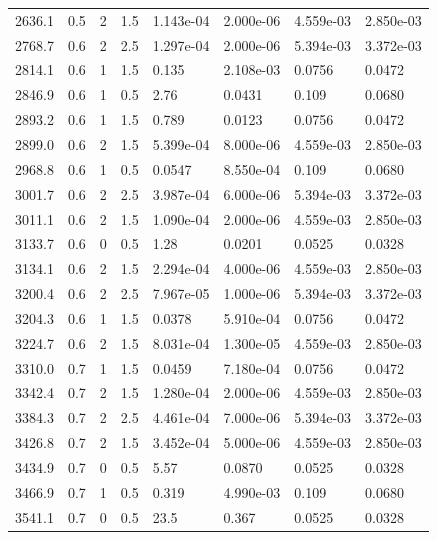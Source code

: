 \documentclass[preview]{standalone}
\begin{document}
{{{\begin{tabular}{L{1.2cm}C{1.2cm} C{0.3cm}C{0.5cm} C{1.4cm}C{1.4cm} C{1.4cm}C{1.4cm}}
  2636.1  &   0.5  & 2     & 1.5 &  1.143e-04  & 2.000e-06  & 4.559e-03 &  2.850e-03   \\ 
  2768.7  &   0.6  & 2     & 2.5 &  1.297e-04  & 2.000e-06  & 5.394e-03 &  3.372e-03   \\ 
  2814.1  &   0.6  & 1     & 1.5 &  0.135  & 2.108e-03  & 0.0756 &  0.0472   \\ 
  2846.9  &   0.6  & 1     & 0.5 &  2.76  & 0.0431  & 0.109 &  0.0680   \\ 
  2893.2  &   0.6  & 1     & 1.5 &  0.789  & 0.0123  & 0.0756 &  0.0472   \\ 
  2899.0  &   0.6  & 2     & 1.5 &  5.399e-04  & 8.000e-06  & 4.559e-03 &  2.850e-03   \\ 
  2968.8  &   0.6  & 1     & 0.5 &  0.0547  & 8.550e-04  & 0.109 &  0.0680   \\ 
  3001.7  &   0.6  & 2     & 2.5 &  3.987e-04  & 6.000e-06  & 5.394e-03 &  3.372e-03   \\ 
  3011.1  &   0.6  & 2     & 1.5 &  1.090e-04  & 2.000e-06  & 4.559e-03 &  2.850e-03   \\ 
  3133.7  &   0.6  & 0     & 0.5 &  1.28  & 0.0201  & 0.0525 &  0.0328   \\ 
  3134.1  &   0.6  & 2     & 1.5 &  2.294e-04  & 4.000e-06  & 4.559e-03 &  2.850e-03   \\ 
  3200.4  &   0.6  & 2     & 2.5 &  7.967e-05  & 1.000e-06  & 5.394e-03 &  3.372e-03   \\ 
  3204.3  &   0.6  & 1     & 1.5 &  0.0378  & 5.910e-04  & 0.0756 &  0.0472   \\ 
  3224.7  &   0.6  & 2     & 1.5 &  8.031e-04  & 1.300e-05  & 4.559e-03 &  2.850e-03   \\ 
  3310.0  &   0.7  & 1     & 1.5 &  0.0459  & 7.180e-04  & 0.0756 &  0.0472   \\ 
  3342.4  &   0.7  & 2     & 1.5 &  1.280e-04  & 2.000e-06  & 4.559e-03 &  2.850e-03   \\ 
  3384.3  &   0.7  & 2     & 2.5 &  4.461e-04  & 7.000e-06  & 5.394e-03 &  3.372e-03   \\ 
  3426.8  &   0.7  & 2     & 1.5 &  3.452e-04  & 5.000e-06  & 4.559e-03 &  2.850e-03   \\ 
  3434.9  &   0.7  & 0     & 0.5 &  5.57  & 0.0870  & 0.0525 &  0.0328   \\ 
  3466.9  &   0.7  & 1     & 0.5 &  0.319  & 4.990e-03  & 0.109 &  0.0680   \\ 
  3541.1  &   0.7  & 0     & 0.5 &  23.5  & 0.367  & 0.0525 &  0.0328   \\ 

\end{tabular}}}}
\end{document}
